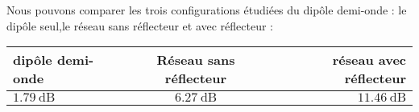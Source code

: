 Nous pouvons comparer les trois configurations étudiées du dipôle demi-onde : le dipôle seul,le réseau sans réflecteur et avec réflecteur :

\begin{tabular}{|l|c|r|}
  \hline
       dipôle demi-onde & Réseau sans réflecteur & réseau avec réflecteur \\
  \hline
  $\SI{1.79}{\deci\bel}$ & $\SI{6.27}{\deci\bel}$ & $\SI{11.46}{\deci\bel}$ \\
  \hline
\end{tabular}



